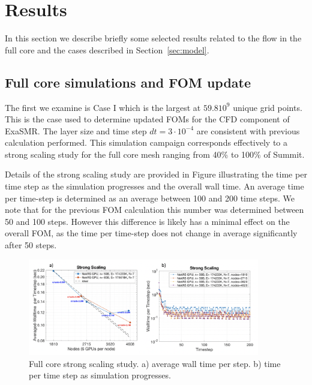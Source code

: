 \section{Results}
\label{sec:results}

In this section we describe briefly some selected results related to the flow in the full core and the cases described in Section~\ref{sec:model}.

\subsection{Full core simulations and FOM update}
\label{sec:results1}

The first we examine is Case I which is the largest at $59.8 10^{9}$ unique grid points. This is the case used to determine updated FOMs for the CFD component of ExaSMR. The layer size and time step $dt=3 \cdot 10^{-4}$ are consistent with previous calculation performed.  This simulation campaign corresponds effectively to a strong scaling study for the full core mesh ranging from 40\% to 100\% of Summit.

Details of the strong scaling study are provided in Figure illustrating the time per time step as the simulation progresses and the overall wall time. An average time per time-step is determined as an average between 100 and 200 time steps. We note that for the previous FOM calculation this number was determined between 50 and 100 steps. However this difference is likely has a  minimal effect on the overall FOM, as the time per time-step does not change in average significantly after 50 steps.

\begin{figure}[!ht]
\centering
\includegraphics[width=0.9\textwidth]{./figures/full_core_strong.png}
\caption{Full core strong scaling study. a) average wall time per step. b) time per time step as simulation progresses. }
\label{fig:strong}
\end{figure}

